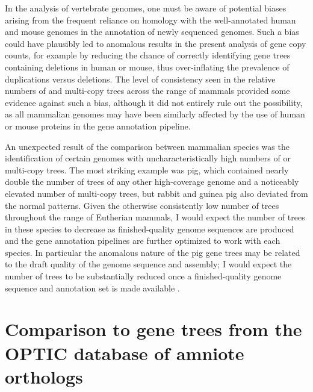 In the analysis of vertebrate genomes, one must be aware of potential
biases arising from the frequent reliance on homology with the
well-annotated human and mouse genomes in the annotation of newly
sequenced genomes. Such a bias could have plausibly led to anomalous
results in the present analysis of gene copy counts, for example by
reducing the chance of correctly identifying gene trees containing
deletions in human or mouse, thus over-inflating the prevalence of
duplications versus deletions. The level of consistency seen in the
relative numbers of \zcop and multi-copy trees across the range of
mammals provided some evidence against such a bias, although it did
not entirely rule out the possibility, as all mammalian genomes may
have been similarly affected by the use of human or mouse proteins in
the \ens gene annotation pipeline.

An unexpected result of the comparison between mammalian species was
the identification of certain genomes with uncharacteristically high
numbers of \zcop or multi-copy trees. The most striking example was
pig, which contained nearly double the number of \zcop trees of any
other high-coverage \mammln genome and a noticeably elevated number of
multi-copy trees, but rabbit and guinea pig also deviated from the
normal patterns. Given the otherwise consistently low number of \zcop
trees throughout the range of Eutherian mammals, I would expect the
number of \zcop trees in these species to decrease as finished-quality
genome sequences are produced and the gene annotation pipelines are
further optimized to work with each species. In particular the
anomalous nature of the pig gene trees may be related to the draft
quality of the genome sequence and assembly; I would expect the number
of \zcop trees to be substantially reduced once a finished-quality
genome sequence and annotation set is made available
\citep{Archibald2010}.


\section{Comparison to gene trees from the OPTIC database of amniote orthologs}

